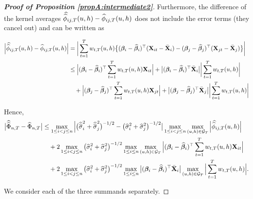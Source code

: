 \documentclass[a4paper,12pt]{article}
\newcommand{\doublehat}[1]{\skew{5.5}\widehat{\widehat{#1}}}
\newcommand{\doublehattwo}[1]{\widehat{\widehat{#1}}}
\begin{document}
\begin{proof}[\textnormal{\textbf{Proof of Proposition \ref{propA:intermediate2}}}]
Furthermore, the difference of the kernel averages $\doublehat{\phi}_{ij, T}(u,h) - \widehat{\phi}_{ij, T}(u,h) $ does not include the error terms (they cancel out) and can be written as
\begin{small}\begin{align*}
\Big| \doublehat{\phi}_{ij, T}(u,h) - \widehat{\phi}_{ij, T}(u,h) \Big|  &=\bigg| \sum_{t=1}^T w_{t,T}(u,h) \big\{ (\bfbeta_i - \widehat{\bfbeta}_i)^\top (\mathbf{X}_{it} - \bar{\mathbf{X}}_{i}) - (\bfbeta_j - \widehat{\bfbeta}_j)^\top (\mathbf{X}_{jt} - \bar{\mathbf{X}}_{j}) \big\} \bigg| \\
 &\le \Big|(\bfbeta_i - \widehat{\bfbeta}_i)^\top \sum_{t=1}^T w_{t,T}(u,h) \mathbf{X}_{it} \Big| +  \big|(\bfbeta_i - \widehat{\bfbeta}_i)^\top\bar{\mathbf{X}}_{i}\big| \bigg| \sum_{t=1}^T w_{t,T}(u,h)  \bigg| \\
&\quad +\Big|(\bfbeta_j - \widehat{\bfbeta}_j)^\top \sum_{t=1}^T w_{t,T}(u,h) \mathbf{X}_{jt}  \Big| + \big|(\bfbeta_j - \widehat{\bfbeta}_j)^\top\bar{\mathbf{X}}_{j}\big| \bigg| \sum_{t=1}^T w_{t,T}(u,h)  \bigg| 
\end{align*}
\end{small}

Hence,
\begin{align}\label{ineq-diff-1}
\begin{split}
\big| \doublehattwo{\Phi}_{n, T} - \widehat{\Phi}_{n, T} \big|& \le  \max_{1 \le i < j \le n} \Big|\big(\doublehattwo{\sigma}_i^2 + \doublehattwo{\sigma}_j^2 \big)^{-1/2} - \big(\widehat{\sigma}_i^2 + \widehat{\sigma}_j^2 \big)^{-1/2}\big|\max_{1 \le i< j \le n} \max_{(u,h) \in \mathcal{G}_T} \Big|\doublehat{\phi}_{ij,T}(u,h)\Big| \\
&\quad+ 2\max_{1\le i < j \le n} \big(\widehat{\sigma}_i^2+ \widehat{\sigma}_j^2 \big)^{-1/2} \max_{1 \le i \le n} \max_{(u,h) \in \mathcal{G}_T} \Big| (\bfbeta_i - \widehat{\bfbeta}_i)^\top\sum_{t=1}^T w_{t,T}(u,h) \mathbf{X}_{it} \Big| \\
&\quad+ 2\max_{1\le i < j \le n} \big(\widehat{\sigma}_i^2+ \widehat{\sigma}_j^2 \big)^{-1/2}\max_{1 \le i \le n}\big|(\bfbeta_i - \widehat{\bfbeta}_i)^\top\bar{\mathbf{X}}_{i}\big| \max_{(u,h) \in \mathcal{G}_T}  \Big| \sum_{t=1}^T w_{t,T}(u,h)  \Big|.
\end{split}
\end{align}

We consider each of the three summands separately.


\end{proof}
\end{document}
